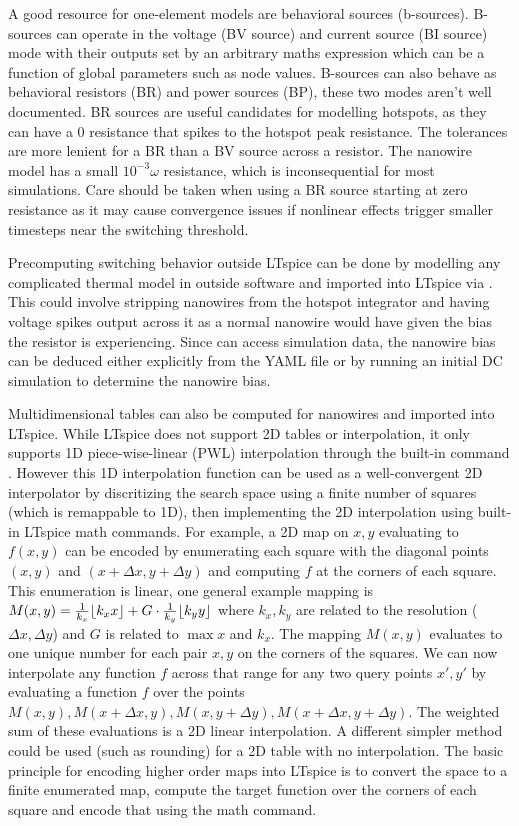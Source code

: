 A good resource for one-element models are behavioral sources (b-sources). B-sources can operate
in the voltage (BV source) and current source (BI source) mode with their outputs set by an arbitrary 
maths expression
which can be a function of global parameters such as node values. B-sources can also behave
as behavioral resistors (BR) and power sources (BP), these two modes aren't well documented.
BR sources are useful candidates for modelling hotspots, as they can have a 0 resistance that spikes
to the hotspot peak resistance. The tolerances are more lenient for a BR than a BV source across
a resistor. The nanowire model has a small $10^{-3}\omega$ resistance, which is inconsequential for
most simulations. Care should be taken when using a BR source starting at zero resistance as it
may cause convergence issues if nonlinear effects trigger smaller timesteps near the switching
threshold.

Precomputing switching behavior outside LTspice can be done by modelling any complicated thermal
model in outside software and imported into LTspice via . This could involve stripping
nanowires from the hotspot integrator and having voltage spikes output across it as a normal
nanowire would have given the bias the resistor is experiencing. Since  can access
simulation data, the nanowire bias can be deduced either explicitly from the YAML file or by
running an initial DC simulation to determine the nanowire bias.

Multidimensional tables can also be computed for nanowires and imported into LTspice. While
LTspice does not
support 2D tables or interpolation, it only supports 1D piece-wise-linear (PWL) interpolation
through the built-in  command \cite{ltspice-bsource-wiki}. However
this 1D interpolation function can be used as a well-convergent 2D interpolator by discritizing
the search space using a finite number of squares (which is remappable to 1D), then implementing
the 2D interpolation using built-in LTspice math commands. For example, a 
2D map on $x, y$ evaluating to $f(x, y)$ can be encoded 
by enumerating each square with the diagonal points $(x, y)$ and $(x+\Delta x, y + \Delta y)$ and 
computing $f$ at the corners of each square. This
enumeration is linear, one general example mapping is $M(x, y) = \frac{1}{k_x}\lfloor k_xx\rfloor+G\cdot \frac{1}{k_y}\lfloor k_yy\rfloor$ where
$k_x, k_y$ are related to the resolution ($\Delta x, \Delta y$) and $G$ is related to $\max{x}$
and $k_x$. 
The mapping $M(x, y)$ evaluates to one unique number for each pair $x, y$ on the corners
of the squares. We can now interpolate any function $f$ across that range for any two query points 
$x', y'$ by evaluating
a function $f$ over the points $M(x, y), M(x+\Delta x, y), M(x, y+\Delta y), M(x+\Delta x, y+\Delta y)$.
The weighted sum of these evaluations is a 2D linear interpolation. A different simpler method could be
used (such as rounding) for a 2D table with no interpolation. The basic principle for encoding higher 
order maps into LTspice is to convert
the space to a finite enumerated map, compute the target function over the corners of each square and
encode that using the  math command. 

